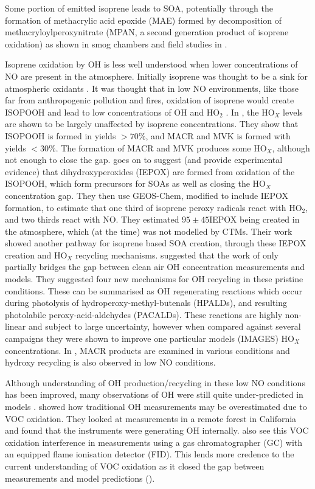     Some portion of emitted isoprene leads to SOA, potentially through the formation of methacrylic acid epoxide (MAE) formed by decomposition of methacryloylperoxynitrate (MPAN, a second generation product of isoprene oxidation) as shown in smog chambers and field studies in \cite{Lin2013}.
    
    Isoprene oxidation by OH is less well understood when lower concentrations of NO are present in the atmosphere.
    Initially isoprene was thought to be a sink for atmospheric oxidants \citep[e.g.][]{Guenther2000}.
    It was thought that in low NO environments, like those far from anthropogenic pollution and fires, oxidation of isoprene would create ISOPOOH and lead to low concentrations of OH and HO$_2$ \cite{Paulot2009b}.
    In \cite{Paulot2009b}, the HO$_X$ levels are shown to be largely unaffected by isoprene concentrations.
    They show that ISOPOOH is formed in yields $> 70\%$, and MACR and MVK is formed with yields $< 30\%$.
    The formation of MACR and MVK produces some HO$_X$, although not enough to close the gap.
    \cite{Paulot2009b} goes on to suggest (and provide experimental evidence) that dihydroxyperoxides (IEPOX) are formed from oxidation of the ISOPOOH, which form precursors for SOAs as well as closing the HO$_X$ concentration gap.
    They then use GEOS-Chem, modified to include IEPOX formation, to estimate that one third of isoprene peroxy radicals react with HO$_2$, and two thirds react with NO. 
    They estimated $95 \pm 45$\tgpyr IEPOX being created in the atmosphere, which (at the time) was not modelled by CTMs.
    Their work showed another pathway for isoprene based SOA creation, through these IEPOX creation and HO$_X$ recycling mechanisms.
    \cite{Peeters2010} suggested that the work of \cite{Paulot2009b} only partially bridges the gap between clean air OH concentration measurements and models.
    They suggested four new mechanisms for OH recycling in these pristine conditions.
    These can be summarised as OH regenerating reactions which occur during photolysis of hydroperoxy-methyl-butenals (HPALDs), and resulting photolabile peroxy-acid-aldehydes (PACALDs).
    These reactions are highly non-linear and subject to large uncertainty, however when compared against several campaigns they were shown to improve one particular models (IMAGES) HO$_X$ concentrations.
    In \cite{Crounse2012}, MACR products are examined in various conditions and hydroxy recycling is also observed in low NO conditions.
    
    Although understanding of OH production/recycling in these low NO conditions has been improved, many observations of OH were still quite under-predicted in models \citep{Mao2012}.
    \cite{Mao2012} showed how traditional OH measurements may be overestimated due to VOC oxidation.
    They looked at measurements in a remote forest in California and found that the instruments were generating OH internally.
    \cite{Nguyen2014} also see this VOC oxidation interference in measurements using a gas chromatographer (GC) with an equipped flame ionisation detector (FID).
    This lends more credence to the current understanding of VOC oxidation as it closed the gap between measurements and model predictions (\cite{Mao2012}).
    
